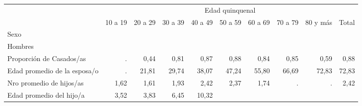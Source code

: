 \begin{tabular}{llllllllll}
\cline{1-10}
\multicolumn{1}{c}{} &
  \multicolumn{9}{|c}{Edad quinquenal} \\
\multicolumn{1}{c}{} &
  \multicolumn{1}{|r}{10 a 19} &
  \multicolumn{1}{r}{20 a 29} &
  \multicolumn{1}{r}{30 a 39} &
  \multicolumn{1}{r}{40 a 49} &
  \multicolumn{1}{r}{50 a 59} &
  \multicolumn{1}{r}{60 a 69} &
  \multicolumn{1}{r}{70 a 79} &
  \multicolumn{1}{r}{80 y más} &
  \multicolumn{1}{r}{Total} \\
\cline{1-10}
\multicolumn{1}{l}{Sexo} &
  \multicolumn{1}{|r}{} &
  \multicolumn{1}{r}{} &
  \multicolumn{1}{r}{} &
  \multicolumn{1}{r}{} &
  \multicolumn{1}{r}{} &
  \multicolumn{1}{r}{} &
  \multicolumn{1}{r}{} &
  \multicolumn{1}{r}{} &
  \multicolumn{1}{r}{} \\
\multicolumn{1}{l}{\hspace{1em}Hombres} &
  \multicolumn{1}{|r}{} &
  \multicolumn{1}{r}{} &
  \multicolumn{1}{r}{} &
  \multicolumn{1}{r}{} &
  \multicolumn{1}{r}{} &
  \multicolumn{1}{r}{} &
  \multicolumn{1}{r}{} &
  \multicolumn{1}{r}{} &
  \multicolumn{1}{r}{} \\
\multicolumn{1}{l}{\hspace{2em}Proporción de Casados/as} &
  \multicolumn{1}{|r}{.} &
  \multicolumn{1}{r}{0,44} &
  \multicolumn{1}{r}{0,81} &
  \multicolumn{1}{r}{0,87} &
  \multicolumn{1}{r}{0,88} &
  \multicolumn{1}{r}{0,84} &
  \multicolumn{1}{r}{0,85} &
  \multicolumn{1}{r}{0,59} &
  \multicolumn{1}{r}{0,88} \\
\multicolumn{1}{l}{\hspace{2em}Edad promedio de la esposa/o} &
  \multicolumn{1}{|r}{.} &
  \multicolumn{1}{r}{21,81} &
  \multicolumn{1}{r}{29,74} &
  \multicolumn{1}{r}{38,07} &
  \multicolumn{1}{r}{47,24} &
  \multicolumn{1}{r}{55,80} &
  \multicolumn{1}{r}{66,69} &
  \multicolumn{1}{r}{72,83} &
  \multicolumn{1}{r}{72,83} \\
\multicolumn{1}{l}{\hspace{2em}Nro promedio de hijos/as} &
  \multicolumn{1}{|r}{1,62} &
  \multicolumn{1}{r}{1,61} &
  \multicolumn{1}{r}{1,93} &
  \multicolumn{1}{r}{2,42} &
  \multicolumn{1}{r}{2,37} &
  \multicolumn{1}{r}{1,74} &
  \multicolumn{1}{r}{.} &
  \multicolumn{1}{r}{.} &
  \multicolumn{1}{r}{2,42} \\
\multicolumn{1}{l}{\hspace{2em}Edad promedio del hijo/a} &
  \multicolumn{1}{|r}{3,52} &
  \multicolumn{1}{r}{3,83} &
  \multicolumn{1}{r}{6,45} &
  \multicolumn{1}{r}{10,32} &

\end{tabular}
